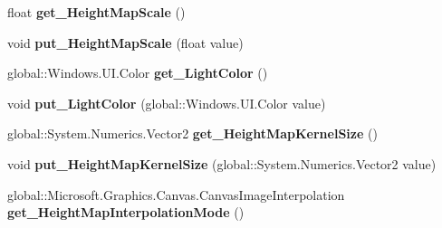 \begin{DoxyCompactItemize}
float {\bfseries get\+\_\+\+Height\+Map\+Scale} ()
\item 
\mbox{\label{class_microsoft_1_1_graphics_1_1_canvas_1_1_effects_1_1_spot_diffuse_effect_af24adcd5276e5609cfdcbc6f82532859}} 
void {\bfseries put\+\_\+\+Height\+Map\+Scale} (float value)
\item 
\mbox{\label{class_microsoft_1_1_graphics_1_1_canvas_1_1_effects_1_1_spot_diffuse_effect_ab441ff26268060cf2301ba839454ad1a}} 
global\+::\+Windows.\+U\+I.\+Color {\bfseries get\+\_\+\+Light\+Color} ()
\item 
\mbox{\label{class_microsoft_1_1_graphics_1_1_canvas_1_1_effects_1_1_spot_diffuse_effect_a1ff4876e34d1d9fb40de722ef1ebb5ac}} 
void {\bfseries put\+\_\+\+Light\+Color} (global\+::\+Windows.\+U\+I.\+Color value)
\item 
\mbox{\label{class_microsoft_1_1_graphics_1_1_canvas_1_1_effects_1_1_spot_diffuse_effect_ac0554aa2307df2cfc4bbe281c0b24f68}} 
global\+::\+System.\+Numerics.\+Vector2 {\bfseries get\+\_\+\+Height\+Map\+Kernel\+Size} ()
\item 
\mbox{\label{class_microsoft_1_1_graphics_1_1_canvas_1_1_effects_1_1_spot_diffuse_effect_a1fcfd03603c1fe8079c16748d9208114}} 
void {\bfseries put\+\_\+\+Height\+Map\+Kernel\+Size} (global\+::\+System.\+Numerics.\+Vector2 value)
\item 
\mbox{\label{class_microsoft_1_1_graphics_1_1_canvas_1_1_effects_1_1_spot_diffuse_effect_a8a26bf0b96be84d07194449d79d4ede8}} 
global\+::\+Microsoft.\+Graphics.\+Canvas.\+Canvas\+Image\+Interpolation {\bfseries get\+\_\+\+Height\+Map\+Interpolation\+Mode} ()
\item 
\mbox{\label{class_microsoft_1_1_graphics_1_1_canvas_1_1_effects_1_1_spot_diffuse_effect_a4dae591b040423df603af220d72dd47c}} 

\end{DoxyCompactItemize}
